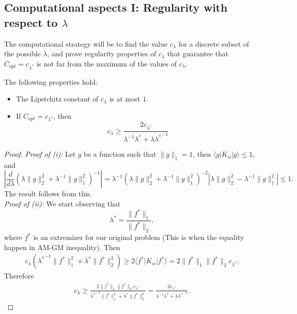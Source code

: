 
\subsection{Computational aspects I: Regularity with respect to \texorpdfstring{$\lambda$}{lambda}} The computational strategy will be to find the value $c_\lambda$ for a discrete subset of the possible $\lambda$, and prove regularity properties of $c_\lambda$ that guarantee that $C_{opt}= c_{\lambda^*}$ is not far from the maximum of the values of $c_{\lambda}$.

\begin{lemma}
The following properties hold:
\begin{itemize}
    \item[(i)] The Lipstchitz constant of $c_{\lambda}$ is at most $1$.
    \item[(ii)] If $C_{opt}=c_{\lambda^*}$, then
    $$
    c_{\lambda} \ge \frac{2 c_{\lambda^*} }{\lambda^{-1}\lambda^*+\lambda{\lambda^*}^{-1}}
    $$
\end{itemize}
\end{lemma}
\begin{proof}
{\it{Proof of (i):}} Let $g$ be a function such that $\|g\|_1 = 1$, then $\langle g|K_w|g\rangle\le 1$, and 
$$
\left|\frac d {d\lambda} (\lambda \|g\|^2_2+ \lambda^{-1} \|g\|^2_1)^{-1}\right| = \lambda^ {-1}(\lambda \|g\|^2_2+ \lambda^{-1} \|g\|^2_1)^{-2} |\lambda \|g\|^2_2- \lambda^{-1}\|g\|^2_1|\le 1.
$$
The result follows from this.\\

{\it{Proof of (ii)}:} %
We start observing that
$$
\lambda^{*}=\frac{\|f^*\|_1}{\|f^*\|_2},
$$
where $f^*$ is an extremizer for our original problem (This is when the equality happen in AM-GM inequality).
Then
\begin{align*}
 c_{\lambda}({\lambda^{*}}^{-1}\|f^*\|^2_1+\lambda^{*}\|f^*\|^2_{2})\geq 2\langle f^*|K_w|f^*\rangle= 2\|f^*\|_1\|f^*\|_2c_{\lambda^*}.
\end{align*}
Therefore
\begin{align*}
    c_{\lambda}\geq \frac{2\|f^*\|_1\|f^*\|_2c_{\lambda^*}}{{\lambda^{*}}^{-1}\|f^*\|^2_1+\lambda^{*}\|f^*\|^2_{2}}=\frac{2c_{\lambda^*} }{\lambda^{-1}\lambda^*+\lambda{\lambda^*}^{-1}}.
\end{align*}
\end{proof}


